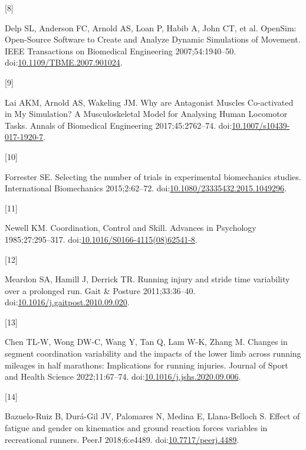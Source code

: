 \documentclass[]{elsarticle} %
\newlength{\cslhangindent}
\newlength{\csllabelwidth}
\newlength{\cslentryspacingunit} %
\newenvironment{CSLReferences}[2] %
 {%
  \setlength{\parindent}{0pt}
  \ifodd #1
  \let\oldpar\par
  \def\par{\hangindent=\cslhangindent\oldpar}
  \fi
  \setlength{\parskip}{#2\cslentryspacingunit}
 }%
 {}
\newcommand{\CSLLeftMargin}[1]{\parbox[t]{\csllabelwidth}{#1}}
\newcommand{\CSLRightInline}[1]{\parbox[t]{\linewidth - \csllabelwidth}{#1}\break}
\begin{document}
\begin{CSLReferences}{0}{0}
\leavevmode{}%
\CSLLeftMargin{{[}8{]} }
\CSLRightInline{Delp SL, Anderson FC, Arnold AS, Loan P, Habib A, John
CT, et al. {OpenSim: Open-Source Software to Create and Analyze Dynamic
Simulations of Movement}. IEEE Transactions on Biomedical Engineering
2007;54:1940--50.
doi:\href{https://doi.org/10.1109/TBME.2007.901024}{10.1109/TBME.2007.901024}.}

\leavevmode{}%
\CSLLeftMargin{{[}9{]} }
\CSLRightInline{Lai AKM, Arnold AS, Wakeling JM. {Why are Antagonist
Muscles Co-activated in My Simulation? A Musculoskeletal Model for
Analysing Human Locomotor Tasks}. Annals of Biomedical Engineering
2017;45:2762--74.
doi:\href{https://doi.org/10.1007/s10439-017-1920-7}{10.1007/s10439-017-1920-7}.}

\leavevmode{}%
\CSLLeftMargin{{[}10{]} }
\CSLRightInline{Forrester SE. {Selecting the number of trials in
experimental biomechanics studies}. International Biomechanics
2015;2:62--72.
doi:\href{https://doi.org/10.1080/23335432.2015.1049296}{10.1080/23335432.2015.1049296}.}

\leavevmode{}%
\CSLLeftMargin{{[}11{]} }
\CSLRightInline{Newell KM. {Coordination, Control and Skill}. Advances
in Psychology 1985;27:295--317.
doi:\href{https://doi.org/10.1016/S0166-4115(08)62541-8}{10.1016/S0166-4115(08)62541-8}.}

\leavevmode{}%
\CSLLeftMargin{{[}12{]} }
\CSLRightInline{Meardon SA, Hamill J, Derrick TR. {Running injury and
stride time variability over a prolonged run}. Gait \& Posture
2011;33:36--40.
doi:\href{https://doi.org/10.1016/j.gaitpost.2010.09.020}{10.1016/j.gaitpost.2010.09.020}.}

\leavevmode{}%
\CSLLeftMargin{{[}13{]} }
\CSLRightInline{Chen TL-W, Wong DW-C, Wang Y, Tan Q, Lam W-K, Zhang M.
{Changes in segment coordination variability and the impacts of the
lower limb across running mileages in half marathons: Implications for
running injuries}. Journal of Sport and Health Science 2022;11:67--74.
doi:\href{https://doi.org/10.1016/j.jshs.2020.09.006}{10.1016/j.jshs.2020.09.006}.}

\leavevmode{}%
\CSLLeftMargin{{[}14{]} }
\CSLRightInline{Bazuelo-Ruiz B, Durá-Gil JV, Palomares N, Medina E,
Llana-Belloch S. {Effect of fatigue and gender on kinematics and ground
reaction forces variables in recreational runners}. PeerJ 2018;6:e4489.
doi:\href{https://doi.org/10.7717/peerj.4489}{10.7717/peerj.4489}.}


\end{CSLReferences}
\end{document}

